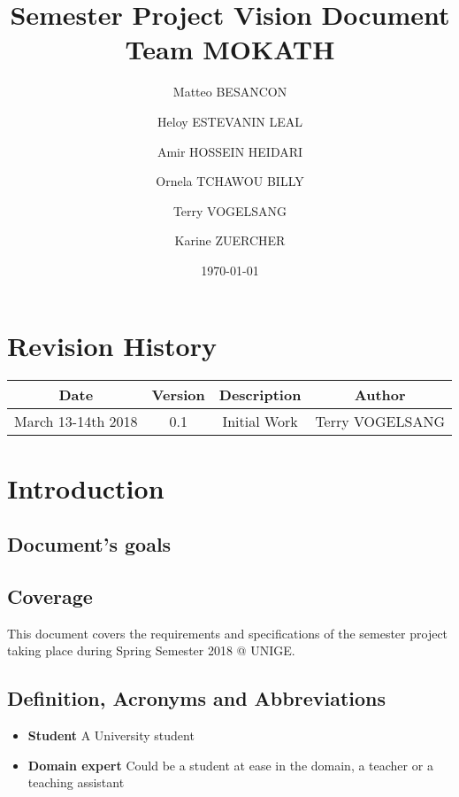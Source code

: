 \documentclass[12pt,a4paper,oneside, titlepage]{article}
\title {Semester Project Vision Document  \\ \large Team MOKATH}
\author{Matteo BESANCON}
\author{Heloy ESTEVANIN LEAL}
\author{Amir HOSSEIN HEIDARI}
\author{Ornela TCHAWOU BILLY}
\author{Terry VOGELSANG}
\author{Karine ZUERCHER}
\affil{Centre Universitaire D'Informatique, University Of Geneva}
\date{\today}
\begin{document}
	\renewcommand{\labelitemi}{$\bullet$}
	\maketitle
	\tableofcontents
	\newpage
	

		\section{Revision History}
		
		\begin{center}
		\def\arraystretch{1.5}
            \begin{tabular}{| c | c | c | c |}
            \hline
            Date & Version & Description & Author \\ \hline
            March 13-14th 2018 & 0.1 & Initial Work  & Terry VOGELSANG \\ \hline
            \end{tabular}
        \end{center}
        
        \newpage
        

	\section{Introduction}
	
		\subsection{Document's goals}
		\subsection{Coverage}
		    This document covers the requirements and specifications of the semester project
		    taking place during Spring Semester 2018 @ UNIGE.
		    
		\subsection{Definition, Acronyms and Abbreviations}
		
		\begin{itemize}
		
		    \item \textbf{Student} A University student
		    \item \textbf{Domain expert} Could be a student at ease in the domain, a teacher or a teaching 
		    assistant
		    
		\end{itemize}
	
\end{document}

